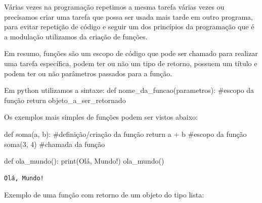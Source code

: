 \documentclass[
  letterpaper,
  DIV=11,
  numbers=noendperiod]{scrreprt}
\newenvironment{Shaded}{\begin{snugshade}}{\end{snugshade}}
\newcommand{\BuiltInTok}[1]{\textcolor[rgb]{0.00,0.23,0.31}{#1}}
\newcommand{\CommentTok}[1]{\textcolor[rgb]{0.37,0.37,0.37}{#1}}
\newcommand{\ControlFlowTok}[1]{\textcolor[rgb]{0.00,0.23,0.31}{#1}}
\newcommand{\DecValTok}[1]{\textcolor[rgb]{0.68,0.00,0.00}{#1}}
\newcommand{\KeywordTok}[1]{\textcolor[rgb]{0.00,0.23,0.31}{#1}}
\newcommand{\NormalTok}[1]{\textcolor[rgb]{0.00,0.23,0.31}{#1}}
\newcommand{\OperatorTok}[1]{\textcolor[rgb]{0.37,0.37,0.37}{#1}}
\newcommand{\StringTok}[1]{\textcolor[rgb]{0.13,0.47,0.30}{#1}}
\begin{document}
Várias vezes na programação repetimos a mesma tarefa várias vezes ou
precisamos criar uma tarefa que possa ser usada mais tarde em outro
programa, para evitar repetição de código e seguir um dos princípios da
programação que é a modulação utilizamos da criação de funções.

Em resumo, funções são um escopo de código que pode ser chamado para
realizar uma tarefa específica, podem ter ou não um tipo de retorno,
possuem um título e podem ter ou não parâmetros passados para a função.

Em python utilizamos a sintaxe: def nome\_da\_funcao(parametros):
\#escopo da função return objeto\_a\_ser\_retornado

Os exemplos mais simples de funções podem ser vistos abaixo:

\begin{Shaded}
\begin{Highlighting}[]
\KeywordTok{def}\NormalTok{ soma(a, b): }\CommentTok{\#definição/criação da função}
    \ControlFlowTok{return}\NormalTok{ a }\OperatorTok{+}\NormalTok{ b }\CommentTok{\#escopo da função}
\NormalTok{soma(}\DecValTok{3}\NormalTok{, }\DecValTok{4}\NormalTok{) }\CommentTok{\#chamada da função}
\end{Highlighting}
\end{Shaded}

\begin{Shaded}
\begin{Highlighting}[]
\KeywordTok{def}\NormalTok{ ola\_mundo():}
    \BuiltInTok{print}\NormalTok{(}\StringTok{\textquotesingle{}Olá, Mundo!\textquotesingle{}}\NormalTok{)}
\NormalTok{ola\_mundo() }
\end{Highlighting}
\end{Shaded}

\begin{tcolorbox}[enhanced jigsaw, breakable, leftrule=.75mm, left=2mm, opacityback=0, bottomrule=.15mm, toprule=.15mm, rightrule=.15mm, arc=.35mm, colback=white]

\begin{verbatim}
Olá, Mundo!
\end{verbatim}

\end{tcolorbox}

Exemplo de uma função com retorno de um objeto do tipo lista:
\end{document}
